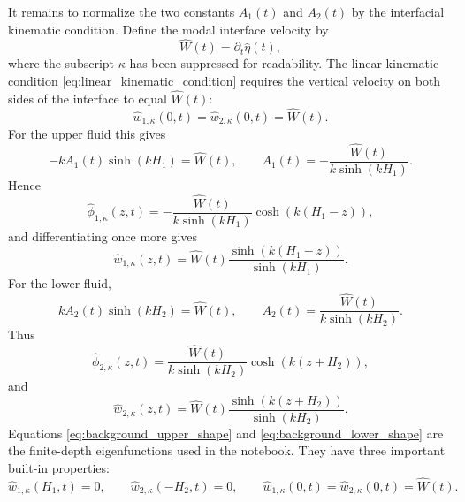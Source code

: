 \documentclass[11pt,a4paper]{article}
\begin{document}
It remains to normalize the two constants $A_1(t)$ and $A_2(t)$ by the interfacial kinematic condition.  Define the modal interface velocity by
\begin{equation}
    \widehat{W}(t)=\partial_t\widehat{\eta}(t),
    \label{eq:modal_interface_velocity}
\end{equation}
where the subscript $\kappa$ has been suppressed for readability.  The linear kinematic condition \eqref{eq:linear_kinematic_condition} requires the vertical velocity on both sides of the interface to equal $\widehat{W}(t)$:
\begin{equation}
    \widehat{w}_{1,\kappa}(0,t)
    =
    \widehat{w}_{2,\kappa}(0,t)
    =
    \widehat{W}(t).
\end{equation}
For the upper fluid this gives
\begin{equation}
    -kA_1(t)\sinh(kH_1)
    =
    \widehat{W}(t),
    \qquad
    A_1(t)
    =
    -\frac{\widehat{W}(t)}{k\sinh(kH_1)}.
\end{equation}
Hence
\begin{equation}
    \widehat{\phi}_{1,\kappa}(z,t)
    =
    -\frac{\widehat{W}(t)}{k\sinh(kH_1)}
    \cosh(k(H_1-z)),
    \label{eq:upper_normalized_potential}
\end{equation}
and differentiating once more gives
\begin{equation}
    \widehat{w}_{1,\kappa}(z,t)
    =
    \widehat{W}(t)
    \frac{\sinh(k(H_1-z))}{\sinh(kH_1)}.
    \label{eq:background_upper_shape}
\end{equation}
For the lower fluid,
\begin{equation}
    kA_2(t)\sinh(kH_2)
    =
    \widehat{W}(t),
    \qquad
    A_2(t)
    =
    \frac{\widehat{W}(t)}{k\sinh(kH_2)}.
\end{equation}
Thus
\begin{equation}
    \widehat{\phi}_{2,\kappa}(z,t)
    =
    \frac{\widehat{W}(t)}{k\sinh(kH_2)}
    \cosh(k(z+H_2)),
    \label{eq:lower_normalized_potential}
\end{equation}
and
\begin{equation}
    \widehat{w}_{2,\kappa}(z,t)
    =
    \widehat{W}(t)
    \frac{\sinh(k(z+H_2))}{\sinh(kH_2)}.
    \label{eq:background_lower_shape}
\end{equation}
Equations \eqref{eq:background_upper_shape} and \eqref{eq:background_lower_shape} are the finite-depth eigenfunctions used in the notebook.  They have three important built-in properties:
\begin{equation}
    \widehat{w}_{1,\kappa}(H_1,t)=0,
    \qquad
    \widehat{w}_{2,\kappa}(-H_2,t)=0,
    \qquad
    \widehat{w}_{1,\kappa}(0,t)=\widehat{w}_{2,\kappa}(0,t)=\widehat{W}(t).
\end{equation}
\end{document}
